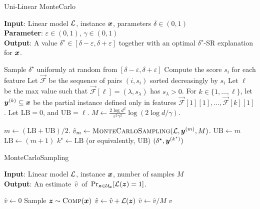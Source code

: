 \renewcommand{\algorithmiccomment}[1]{\; \; \texttt{/* #1 */}}
\begin{algorithm}[tb]
	\caption{Uni-Linear MonteCarlo}
	\label{alg:algorithm}
	\textbf{Input}: Linear model $\mathcal{L}$, instance ${\bm{x}}$, parameters $\delta \in (0, 1)$\\
	\textbf{Parameter}:  $\varepsilon \in (0, 1)$,  $\gamma \in (0, 1)$\\
	\textbf{Output}: A value $\delta^\star \in [\delta-\varepsilon, \delta+\varepsilon]$ together with an optimal $\delta^\star$-SR explanation for ${\bm{x}}$.\\
	\begin{algorithmic}[1] %
	\STATE Sample $\delta^\star$ uniformly at random from $[\delta-\varepsilon, \delta + \varepsilon]$
	\STATE Compute the score $s_i$ for each feature
	\STATE Let $\vec{\mathcal{F}}$ be the sequence of pairs $(i, s_i)$ sorted decreasingly by $s_i$
	\STATE Let $\ell$ be the max value such that $\vec{\mathcal{F}}[\ell] = (\lambda, s_\lambda)$ has $s_\lambda > 0$.
	\STATE For $k \in \{1, \ldots, \ell\}$, let ${\bm{y}}^{(k)} \subseteq {\bm{x}}$ be the partial instance defined only in features $\vec{\mathcal{F}}[1][1], \ldots, \vec{\mathcal{F}}[k][1]$.
	\STATE Let $\textrm{LB} = 0$, and $\textrm{UB} = \ell$.
	\STATE $M \gets \frac{2\log d^2}{\varepsilon^2 \gamma^2} \log(2 \log d / \gamma)$.

		\STATE $m \gets \left(\textrm{LB} + \textrm{UB} \right)/2$.
		\STATE $\hat{v}_m \gets \textsc{MonteCarloSampling}(\mathcal{L}, {\bm{y}}^{(m)}, M)$.
			\STATE $\textrm{UB} \gets m$
		\ELSE
			\STATE $\textrm{LB} \gets (m+1)$
		\ENDIF
	\ENDWHILE
	\STATE $k^\star \gets \textrm{LB}$ (or equivalently, $\textrm{UB}$)
	\STATE \RETURN $(\delta^\star, {\bm{y}}^{(k^\star)})$
	\end{algorithmic}
	\end{algorithm}


\begin{algorithm}[tb]
	\caption{MonteCarloSampling}	\label{alg:montecarlo}
	\textbf{Input}: Linear model $\mathcal{L}$, instance ${\bm{x}}$, number of samples $M$\\
	\textbf{Output}: An estimate~$\hat{v}$~of~$\Pr_{{\bm{z}} \in \mathcal{U}_{\bm{x}}}[\mathcal{L}({\bm{z}})=1]$.\\
	\begin{algorithmic}[1]
	\STATE $\hat{v} \gets 0$
		\STATE Sample ${\bm{z}} \sim \textsc{Comp}({\bm{x}})$
		\STATE $\hat{v} \gets \hat{v} + \mathcal{L}({\bm{z}})$
	\ENDFOR
	\STATE $\hat{v} \gets \hat{v}/M$
	\STATE \RETURN $\hat{v}$
\end{algorithmic}
\end{algorithm}


